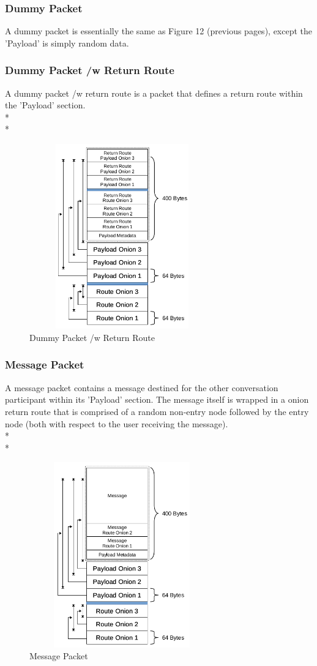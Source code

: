 \documentclass{article}
\begin{document}
\subsubsection{Dummy Packet}
A dummy packet is essentially the same as Figure 12 (previous pages), except the 'Payload' is simply random data.
\newpage
\subsubsection{Dummy Packet /w Return Route}
A dummy packet /w return route is a packet that defines a return route within the 'Payload' section.\\*\\*
\begin{figure}[h]
	\centering
  	\includegraphics[width=8cm,height=8cm,keepaspectratio]{img/DummyPacketWReturnRoute.png}
	\caption{Dummy Packet /w Return Route}
\end{figure}
\newpage
\subsubsection{Message Packet}
A message packet contains a message destined for the other conversation participant within its 'Payload' section. The message itself is wrapped in a onion return route that is comprised of a random non-entry node followed by the entry node (both with respect to the user receiving the message).\\*\\*
\begin{figure}[h]
	\centering
  	\includegraphics[width=8cm,height=8cm,keepaspectratio]{img/MessagePacketStructure.png}
	\caption{Message Packet}
\end{figure}
\newpage
\end{document}
